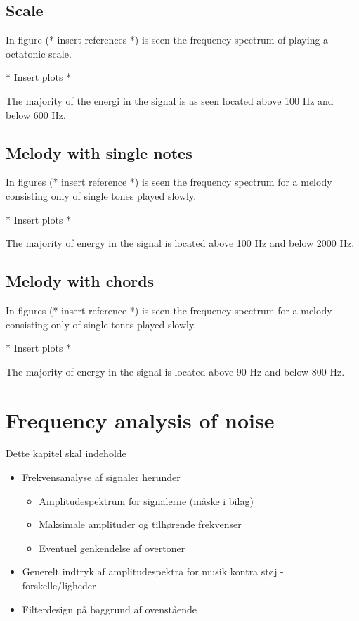 \subsection{Scale}
In figure (* insert references *) is seen the frequency spectrum of playing a octatonic scale.
\begin{center}
* Insert plots *
\end{center}
The majority of the energi in the signal is as seen located above 100 Hz and below 600 Hz.
\subsection{Melody with single notes}
In figures (* insert reference *) is seen the frequency spectrum for a melody consisting only of single tones played slowly.
\begin{center}
* Insert plots *
\end{center}
The majority of energy in the signal is located above 100 Hz and below 2000 Hz.
\subsection{Melody with chords}
In figures (* insert reference *) is seen the frequency spectrum for a melody consisting only of single tones played slowly.
\begin{center}
* Insert plots *
\end{center}
The majority of energy in the signal is located above 90 Hz and below 800 Hz.
\section{Frequency analysis of noise}



\clearpage
Dette kapitel skal indeholde
\begin{itemize}
\item Frekvensanalyse af signaler herunder
\begin{itemize}
\item Amplitudespektrum for signalerne (måske i bilag)
\item Maksimale amplituder og tilhørende frekvenser
\item Eventuel genkendelse af overtoner
\end{itemize}
\item Generelt indtryk af amplitudespektra for musik kontra støj - forskelle/ligheder
\item Filterdesign på baggrund af ovenstående
\end{itemize}